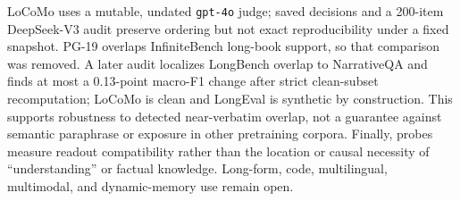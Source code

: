 LoCoMo uses a mutable, undated \texttt{gpt-4o} judge; saved decisions and a
200-item DeepSeek-V3 audit preserve ordering but not exact reproducibility under
a fixed snapshot. PG-19 overlaps InfiniteBench long-book support, so that
comparison was removed. A later audit localizes LongBench overlap to
NarrativeQA and finds at most a 0.13-point macro-F1 change after strict
clean-subset recomputation; LoCoMo is clean and LongEval is synthetic by
construction. This supports robustness to detected near-verbatim overlap, not a
guarantee against semantic paraphrase or exposure in other pretraining corpora.
Finally, probes measure
readout compatibility rather than the location or causal necessity of
``understanding'' or factual knowledge. Long-form, code, multilingual,
multimodal, and dynamic-memory use remain open.
